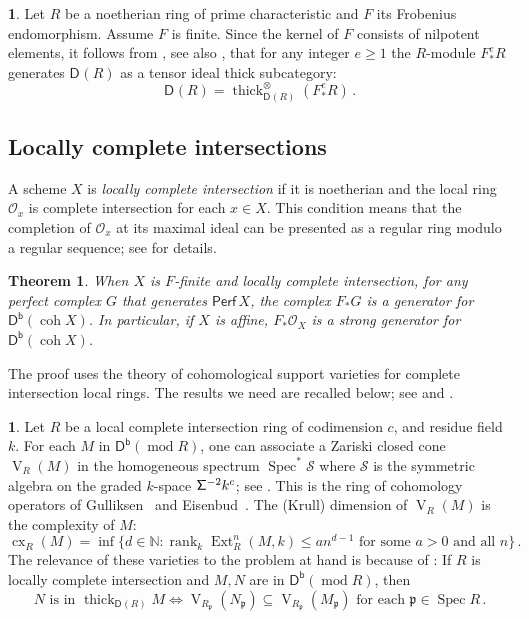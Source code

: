 \documentclass{amsart}
\newcommand{\dcat}[2][]{\cat{D}_{#1}(#2)}
\newcommand{\perf}[1]{\mathsf{Perf}\,#1}
\newcommand{\coh}{\operatorname{coh}}
\newcommand{\dbcat}[1]{\cat{D}^{\mathsf{b}}(#1)}
\newcommand{\mcS}{\mathcal{S}}
\newcommand{\mco}{\mathcal{O}}
\newcommand{\fp}{\mathfrak{p}}
\newcommand{\cat}[1]{{\mathsf{#1}}}
\newcommand{\cx}{\operatorname{cx}}
\newcommand{\Ext}{\operatorname{Ext}}
\newcommand{\rmod}{\operatorname{mod}}
\newcommand{\rank}{\operatorname{rank}}
\newcommand{\shift}{{\sf\Sigma}}
\newcommand{\spec}{\operatorname{Spec}}
\newcommand{\thick}{\operatorname{thick}}
\newcommand{\rmV}{\operatorname{V}}
\newtheorem{theorem}[subsection]{Theorem}
\theoremstyle{definition}
\newtheorem{chunk}[subsection]{}
\theoremstyle{remark}
\numberwithin{equation}{subsection}
\begin{document}
\begin{chunk}
Let $R$ be a noetherian ring of prime characteristic and $F $ its Frobenius endomorphism. Assume $F $ is finite. Since the kernel of $F $ consists of nilpotent elements, it follows from \cite[Theorem~3.16]{Mathew:2018}, see also \cite[Section~11]{Bhatt/Scholze:2017a}, that for any integer $e\ge 1$ the $R$-module $F ^e_*R$ generates $\dcat R$ as a tensor ideal thick subcategory:
\[
\dcat R = \thick_{\dcat R}^{\otimes}(F ^e_*R)\,.
\]
\end{chunk}

\subsection*{Locally complete intersections}
\label{se:lci}

A scheme $X$ is \emph{locally complete intersection} if it is noetherian and the local ring $\mco_x$ is complete intersection for each $x\in X$. This condition means that the completion of $\mco_x$ at its maximal ideal can be presented as a regular ring modulo a regular sequence; see \cite[Section~2.3]{Bruns/Herzog:1998} for details.

\begin{theorem}
\label{th:completeintersection}
When $X$ is $F$-finite and locally complete intersection, for any perfect complex $G$ that generates $\perf X$, the complex $F_*G$ is a generator for $\dbcat{\coh X}$. In particular, if $X$ is affine, $F_*\mco_X$ is a strong generator for $\dbcat{\coh X}$.
\end{theorem}

The proof uses the theory of cohomological support varieties for complete intersection local rings. The results we need are recalled below; see \cite{Avramov:1989} and \cite{Avramov/Buchweitz:2000b}. 

\begin{chunk}
\label{ch:supportvarieties}
Let $R$ be a local complete intersection ring of codimension $c$, and residue field $k$. For each $M$ in $ \dbcat{\rmod R}$, one can associate a Zariski closed cone $\rmV_R(M)$ in the homogeneous spectrum $\spec^* \mcS$ where $\mcS$ is the symmetric algebra on the graded $k$-space $\shift^{-2}k^c$; see \cite{Avramov:1989}. This is the ring of cohomology operators of Gulliksen~\cite{Gulliksen:1974} and Eisenbud~\cite{Eisenbud:1980}. The (Krull) dimension of $\rmV_R(M)$ is the complexity of $M$: 
\[
\cx_R(M)=\inf\{d\in \mathbb{N}: \rank_k \Ext_R^n(M,k)\le a n^{d-1}\text{ for some $a>0$ and all $n$}\}\,.
\]
The relevance of these varieties to the problem at hand is because of \cite[Theorem~3.1]{Liu/Pollitz:2021}: If $R$ is locally complete intersection and $M,N$ are in $ \dbcat{\rmod R}$, then 
\[
N\text{ is in }\thick_{\dcat R} M\iff \rmV_{R_\fp}(N_\fp)\subseteq \rmV_{R_\fp}(M_\fp) \text{ for each } \fp\in \spec R\,.
\]
\end{chunk}
\end{document}

